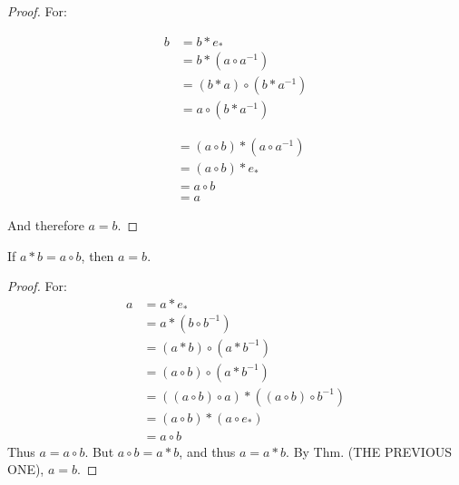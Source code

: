             \begin{proof}
                For:
                \par
                \begin{minipage}[b]{0.49\textwidth}
                    \begin{align}
                        b&=b*e_{*}\tag{Identity}\\
                         &=b*(a\circ a^{-1})\tag{Pseudo-Inverse}\\
                         &=(b*a)\circ(b* a^{-1})\tag{Distributivity}\\
                         &=a\circ (b* a^{-1})\tag{Hypothesis}
                    \end{align}
                \end{minipage}
                \hfill
                \begin{minipage}[b]{0.49\textwidth}
                    \begin{align}
                        &=(a\circ b)*(a\circ a^{-1})\tag{Distributivity}\\
                        &=(a\circ{b})*e_{*}\tag{Pseudo-Inverse}\\
                        &=a\circ{b}\tag{Identity}\\
                        &=a\tag{Hypothesis}
                    \end{align}
                \end{minipage}
                \par\vspace{2.5ex}
                And therefore $a=b$.
            \end{proof}
            \begin{theorem}
                If $a*b=a\circ{b}$, then $a=b$.
            \end{theorem}
            \begin{proof}
                For:
                \begin{align*}
                    a&=a*e_{*}\\
                    &=a*(b\circ{b}^{\minus{1}})\\
                    &=(a*b)\circ(a*b^{\minus{1}})\\
                    &=(a\circ{b})\circ(a*b^{\minus{1}})\\
                    &=((a\circ{b})\circ{a})*((a\circ{b})\circ{b}^{\minus{1}})\\
                    &=(a\circ{b})*(a\circ{e}_{*})\\
                    &=a\circ{b}
                \end{align*}
                Thus $a=a\circ{b}$. But $a\circ{b}=a*{b}$, and thus
                $a=a*{b}$. By Thm. (THE PREVIOUS ONE), $a=b$.
            \end{proof}
